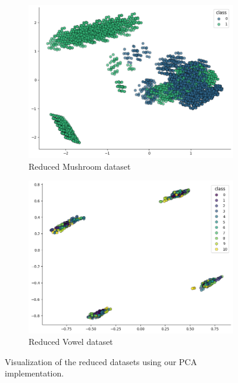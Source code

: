 \begin{figure}[h!]
    \centering
    \begin{subfigure}[b]{0.45\textwidth}
        \centering
        \includegraphics[width=\textwidth]{figures/mushroom_our_pca.png}
        \caption{Reduced Mushroom dataset}
        \label{our_pca_mushroom}
    \end{subfigure}
    \hfill
    \begin{subfigure}[b]{0.45\textwidth}
        \centering
        \includegraphics[width=\textwidth]{figures/vowel_our_pca.png}
        \caption{Reduced Vowel dataset}
        \label{our_pca_vowel}
    \end{subfigure}
    
    \caption{Visualization of the reduced datasets using our PCA implementation.}
    \label{fig:our_pca_datasets}
\end{figure}

